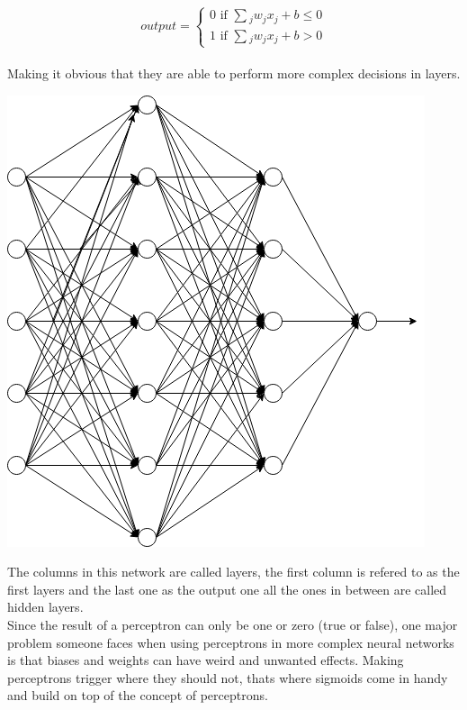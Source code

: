 \vspace{0.5cm}
    \begin{equation*}
        output=
        \begin{cases}
            0 \text{ if } \sum{_j}{w_jx_j+b \le 0}\\
            1 \text{ if } \sum{_j}{w_jx_j+b > 0}
        \end{cases}
    \end{equation*}
\vspace{0.5cm} \\
Making it obvious that they are able to perform more complex decisions in layers.
\begin{center}
    \includegraphics[scale=0.5]{images/neural_network.png}
\end{center}
\newpage
\noindent
The columns in this network are called layers, the first column is refered to as the first layers and the last one as the output one all the
ones in between are called hidden layers. \\
Since the result of a perceptron can only be one or zero (true or false), one major problem someone faces when using perceptrons in more
complex neural networks is that biases and weights can have weird and unwanted effects. Making perceptrons trigger where they should not,
thats where sigmoids come in handy and build on top of the concept of perceptrons.

